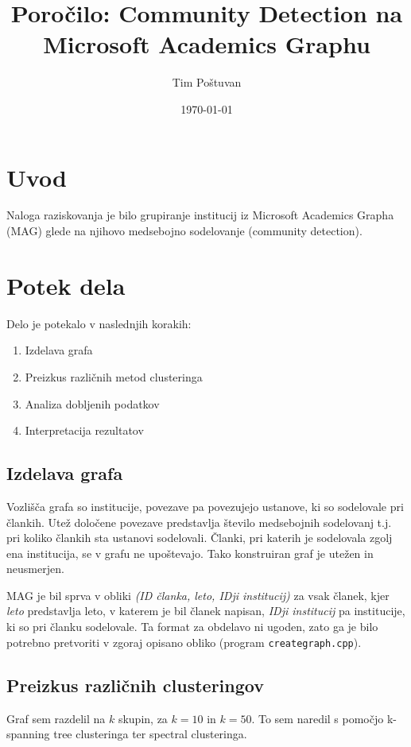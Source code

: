 \documentclass[a4paper,12pt]{article}
\title{Poročilo: Community Detection na Microsoft Academics Graphu}
\author{Tim Poštuvan}
\date{\today}
\begin{document}
	\maketitle	
	
	\section{Uvod}
	Naloga raziskovanja je bilo grupiranje institucij iz Microsoft Academics Grapha (MAG) glede na njihovo medsebojno sodelovanje (community detection). 
	
	\section{Potek dela}
	Delo je potekalo v naslednjih korakih:
	\begin{enumerate}
		\item Izdelava grafa
		\item Preizkus različnih metod clusteringa
		\item Analiza dobljenih podatkov
		\item Interpretacija rezultatov
	\end{enumerate}

	\subsection{Izdelava grafa}
	Vozlišča grafa so institucije, povezave pa povezujejo ustanove, ki so sodelovale pri člankih. Utež določene povezave predstavlja število medsebojnih sodelovanj t.j. pri koliko člankih sta ustanovi sodelovali. Članki, pri katerih je sodelovala zgolj ena institucija, se v grafu ne upoštevajo. Tako konstruiran graf je utežen in neusmerjen.
	
	MAG je bil sprva v obliki \textit{(ID članka, leto, IDji institucij)} za vsak članek, kjer \textit{leto} predstavlja leto, v katerem je bil članek napisan, \textit{IDji institucij} pa institucije, ki so pri članku sodelovale. Ta format za obdelavo ni ugoden, zato ga je bilo potrebno pretvoriti v zgoraj opisano obliko (program \texttt{create\textunderscore graph.cpp}). 
	
	\subsection{Preizkus različnih clusteringov}
	Graf sem razdelil na $k$ skupin, za $k = 10$ in $k = 50$. To sem naredil s pomočjo k-spanning tree clusteringa ter spectral clusteringa.
	
\end{document}
